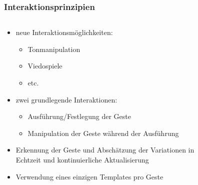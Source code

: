 \documentclass{beamer}
\begin{document}
\begin{frame}\frametitle{Interaktionsprinzipien}
\begin{columns}

\begin{column}{.55\textwidth}
\begin{itemize}
\item neue Interaktionsmöglichkeiten:
\begin{itemize}
\item Tonmanipulation
\item Viedospiele
\item etc.
\end{itemize}
\item zwei grundlegende Interaktionen:
\begin{itemize}
\item Ausführung/Festlegung der Geste
\item Manipulation der Geste während der Ausführung
\end{itemize}
\item Erkennung der Geste und Abschätzung der Variationen in Echtzeit und kontinuierliche Aktualisierung
\item Verwendung eines einzigen Templates pro Geste
\end{itemize}
\end{column}
\begin{column}{.4\textwidth}
\begin{figure}
\centering

\end{figure}
\end{column}
\end{columns}
\end{frame}
\end{document}
